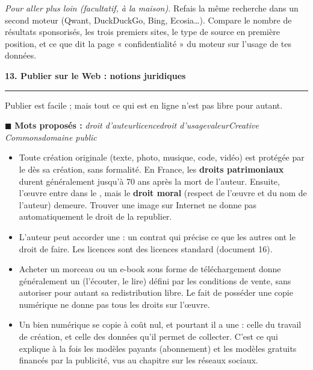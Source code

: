 \documentclass[11pt,a4paper]{article}
\newif\ifprof
\newcommand{\sect}[1]{%
  \par\addvspace{10pt}%
  {\color{navy}\Large\bfseries #1\par}\vspace{3pt}%
  {\color{navy}\hrule height 0.6pt}\vspace{6pt}}
\newcommand{\trou}[2][3cm]{\ifprof\textcolor{corr}{\underline{\textbf{\,#2\,}}}\else\underline{\hspace{#1}}\fi}
\newcommand{\motsproposes}[1]{\begin{mots}\small\textcolor{orangeT}{$\blacksquare$ \textbf{Mots proposés :}} \textit{#1}\end{mots}}
\newcommand{\ensei}[1]{\ifprof\begin{tcolorbox}[enhanced,colback=gris,colframe=corr!60,boxrule=0.5pt,arc=2pt,
  left=5pt,right=5pt,top=3pt,bottom=3pt,before skip=6pt,after skip=6pt,fontupper=\small]
  \textcolor{corr}{\textbf{Note enseignant.}} #1\end{tcolorbox}\fi}
\begin{document}
\emph{Pour aller plus loin (facultatif, à la maison).} Refais la même recherche dans un second moteur (Qwant, DuckDuckGo, Bing, Ecosia…). Compare le nombre de résultats sponsorisés, les trois premiers sites, le type de source en première position, et ce que dit la page « confidentialité » du moteur sur l'usage de tes données.

\ensei{C'est l'analyse critique qui est évaluée, pas le choix de la source. Pour la partie facultative : les résultats diffèrent (index, classement et personnalisation différents) ; les moteurs « respectueux de la vie privée » (Qwant, DuckDuckGo) ne personnalisent pas, ou peu.}

\sect{13. Publier sur le Web : notions juridiques}

Publier est facile ; mais tout ce qui est en ligne n'est pas libre pour autant.

\motsproposes{droit d'auteur\enspace\textbullet\enspace licence\enspace\textbullet\enspace droit d'usage\enspace\textbullet\enspace valeur\enspace\textbullet\enspace Creative Commons\enspace\textbullet\enspace domaine public}

\begin{itemize}
\item Toute création originale (texte, photo, musique, code, vidéo) est protégée par le \trou[2.8cm]{droit d'auteur} dès sa création, sans formalité. En France, les \textbf{droits patrimoniaux} durent généralement jusqu'à 70 ans après la mort de l'auteur. Ensuite, l'œuvre entre dans le \trou[2.8cm]{domaine public}, mais le \textbf{droit moral} (respect de l'œuvre et du nom de l'auteur) demeure. Trouver une image sur Internet ne donne pas automatiquement le droit de la republier.
\item L'auteur peut accorder une \trou[2cm]{licence} : un contrat qui précise ce que les autres ont le droit de faire. Les licences \trou[3.5cm]{Creative Commons} sont des licences standard (document 16).
\item Acheter un morceau ou un e-book sous forme de téléchargement donne généralement un \trou[3cm]{droit d'usage} (l'écouter, le lire) défini par les conditions de vente, sans autoriser pour autant sa redistribution libre. Le fait de posséder une copie numérique ne donne pas tous les droits sur l'œuvre.
\item Un bien numérique se copie à coût nul, et pourtant il a une \trou[2cm]{valeur} : celle du travail de création, et celle des données qu'il permet de collecter. C'est ce qui explique à la fois les modèles payants (abonnement) et les modèles gratuits financés par la publicité, vus au chapitre sur les réseaux sociaux.
\end{itemize}
\end{document}

